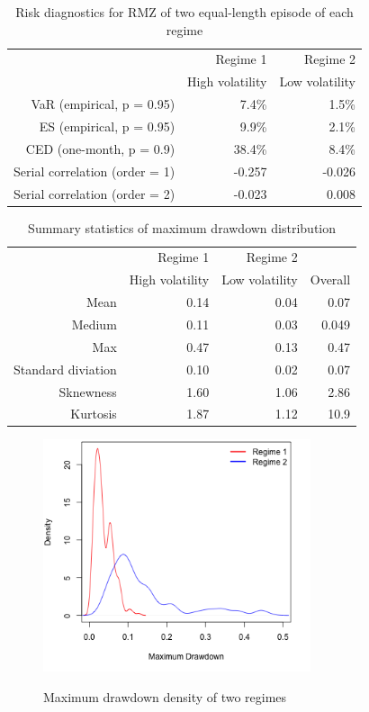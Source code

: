 \documentclass[12pt]{article}
\begin{document}
\begin{table}[h]
\caption{Risk diagnostics for RMZ of two equal-length episode of each regime} 
\centering 
\begin{tabular}{| r | r | r |} 
 \hline
& Regime 1 & Regime 2 \\
& High volatility & Low volatility \\
 \hline 
VaR (empirical, p = 0.95) & 7.4\% & 1.5\% \\
ES (empirical, p = 0.95) & 9.9\% & 2.1\% \\
CED (one-month, p = 0.9) & 38.4\% & 8.4\% \\
Serial correlation (order = 1) & -0.257 & -0.026 \\
Serial correlation (order = 2) & -0.023 & 0.008 \\
 \hline
\end{tabular}
\label{table:ridkDiagsRegimeRMZ}
\end{table}

\begin{table}[h]
\caption{Summary statistics of maximum drawdown distribution} 
\centering 
\begin{tabular}{| r | r | r | r |} 
 \hline
& Regime 1 & Regime 2 & \\
& High volatility & Low volatility & Overall \\
 \hline 
Mean & 0.14 & 0.04 & 0.07\\
Medium  & 0.11 & 0.03 & 0.049 \\
Max  & 0.47 & 0.13 & 0.47\\
Standard diviation & 0.10 & 0.02 & 0.07\\
Sknewness & 1.60 & 1.06 & 2.86\\
Kurtosis  & 1.87 & 1.12 & 10.9\\
 \hline
\end{tabular}
\label{table:SummatyMDDRegimeRMZ}
\end{table}


\begin{figure}[h]
\caption{Maximum drawdown density of two regimes} 
\centering 
\includegraphics[width=0.7\textwidth]{../results/regime/RMZ_mon1_mdd}
\label{fig: RMZregime_mdd}
\end{figure}
\end{document}

